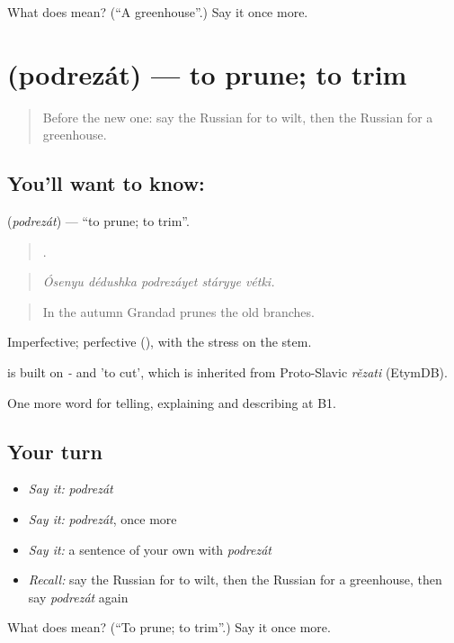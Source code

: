 \begin{tcolorbox}[breakable,colback=teal!4,colframe=teal!35!black,title={Before you move on}]
What does  mean? (\textquotedblleft{}A greenhouse\textquotedblright{}.) Say it once more.
\end{tcolorbox}
\section[\texorpdfstring{\ru{подрезать} (podrezát)}{подрезать (podrezát)}]{ (podrezát) — to prune; to trim}

\label{lesson:RU-C507-podrezat}



\begin{quote}
Before the new one: say the Russian for to wilt, then the Russian for a greenhouse.
\end{quote}

\subsection*{You'll want to know: }
\textbf{} (\emph{podrezát}) — \textquotedblleft{}to prune; to trim\textquotedblright{}.

\begin{quote}
    .
\end{quote}

\begin{quote}
\emph{Ósenyu dédushka podrezáyet stáryye vétki.}
\end{quote}

\begin{quote}
In the autumn Grandad prunes the old branches.
\end{quote}

Imperfective; perfective  (), with the stress on the stem.

\begin{cousinweb}
\emph{} is built on \emph{-} and \emph{} 'to cut', which is inherited from Proto-Slavic \emph{rězati} (EtymDB).
\end{cousinweb}

\begin{grammarlens}[title={What you've built}]
One more word for telling, explaining and describing at B1.
\end{grammarlens}

\subsection*{Your turn}
\begin{itemize}
\raggedright
  \item \emph{Say it:} \emph{podrezát}
  \item \emph{Say it:} \emph{podrezát}, once more
  \item \emph{Say it:} a sentence of your own with \emph{podrezát}
  \item \emph{Recall:} say the Russian for to wilt, then the Russian for a greenhouse, then say \emph{podrezát} again
\end{itemize}

\begin{tcolorbox}[breakable,colback=teal!4,colframe=teal!35!black,title={Before you move on}]
What does  mean? (\textquotedblleft{}To prune; to trim\textquotedblright{}.) Say it once more.
\end{tcolorbox}
